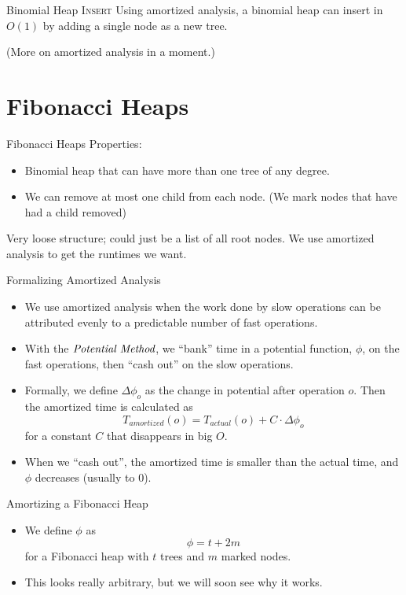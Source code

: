\documentclass[aspectratio=169]{beamer}
\begin{document}
\begin{frame}{Binomial Heap \textsc{Insert}}
    Using amortized analysis, a binomial heap can insert in \textcolor{sigma@mainblue}{$O(1)$} by adding a single node as a new tree.

    (More on amortized analysis in a moment.)
\end{frame}




\section{Fibonacci Heaps}
\frame{\sectionpage}

\begin{frame}{Fibonacci Heaps}
    Properties:
    \begin{itemize}
        \item Binomial heap that can have more than one tree of any degree.\pause
        \item We can remove at most one child from each node. (We mark nodes that have had a child removed) \pause
    \end{itemize}
    Very loose structure; could just be a list of all root nodes. We use amortized analysis to get the runtimes we want.
\end{frame}


\begin{frame}{Formalizing Amortized Analysis}
    \begin{itemize}
        \item We use amortized analysis when the work done by slow operations can be attributed evenly to a predictable number of fast operations.\pause
        \item With the $\emph{Potential Method}$, we ``bank'' time in a potential function, $\phi$, on the fast operations, then ``cash out'' on the slow operations.\pause
        \item Formally, we define $\Delta \phi_o$ as the change in potential after operation $o$. Then the amortized time is calculated as $$T_{\textit{amortized}}(o) = T_{\textit{actual}}(o) + C\cdot \Delta \phi_o$$ for a constant $C$ that disappears in big $O$.\pause
        \item When we ``cash out'', the amortized time is smaller than the actual time, and $\phi$ decreases (usually to $0$).
    \end{itemize}
\end{frame}


\begin{frame}{Amortizing a Fibonacci Heap}
    \begin{itemize}
        \item We define $\phi$ as $$\phi = t + 2m$$ for a Fibonacci heap with $t$ trees and $m$ marked nodes.
        \pause
        \item This looks really arbitrary, but we will soon see why it works. 
    \end{itemize}
\end{frame}
\end{document}
